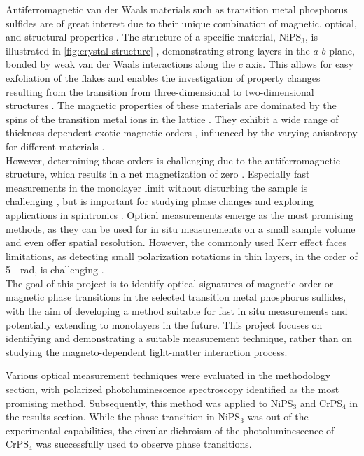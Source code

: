 \documentclass[
	twoside,
	parskip=half,
	a4paper,
]{scrbook}
\begin{document}
Antiferromagnetic van der Waals materials such as transition metal phosphorus sulfides are of great interest due to their unique combination of magnetic, optical, and structural properties \cite{MPX_review,MPS_magnetism}. 
The structure of a specific material, NiPS$_3$, is illustrated in \autoref{fig:crystal structure} \cite{NiPS3_coherent}, demonstrating strong layers in the $a$-$b$ plane, bonded by weak van der Waals interactions along the $c$ axis.
This allows for easy exfoliation of the flakes and enables the investigation of property changes resulting from the transition from three-dimensional to two-dimensional structures \cite{MPX_review}.
The magnetic properties of these materials are dominated by the spins of the transition metal ions in the lattice \cite{MPS_magnetism}.
They exhibit a wide range of thickness-dependent exotic magnetic orders \cite{AFM_review}, influenced by the varying anisotropy for different materials \cite{MPS_magnetism, CrPS4_magnetic}.\\
However, determining these orders is challenging due to the antiferromagnetic structure, which results in a net magnetization of zero \cite{MPS_magnetism}.
Especially fast measurements in the monolayer limit without disturbing the sample is challenging \cite{AFM_review, CrPS4_magnetic}, but is important for studying phase changes and exploring applications in spintronics \cite{AFM_review}.
Optical measurements emerge as the most promising methods, as they can be used for in situ measurements on a small sample volume and even offer spatial resolution. 
However, the commonly used Kerr effect faces limitations, as detecting small polarization rotations in thin layers, in the order of \SI{5}{\mu rad}, is challenging \cite{AFM_review}.\\
The goal of this project is to identify optical signatures of magnetic order or magnetic phase transitions in the selected transition metal phosphorus sulfides, with the aim of developing a method suitable for fast in situ measurements and potentially extending to monolayers in the future.
This project focuses on identifying and demonstrating a suitable measurement technique, rather than on studying the magneto-dependent light-matter interaction process.

Various optical measurement techniques were evaluated in the methodology section, with polarized photoluminescence spectroscopy identified as the most promising method.
Subsequently, this method was applied to NiPS$_3$ and CrPS$_4$ in the results section.
While the phase transition in NiPS$_3$ was out of the experimental capabilities, the circular dichroism of the photoluminescence of CrPS$_4$ was successfully used to observe phase transitions.
\end{document}
